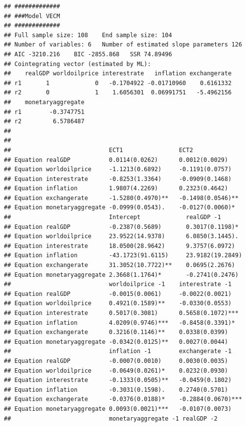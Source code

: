 \documentclass[11pt,preprint, authoryear]{elsarticle}
\numberwithin{equation}{section}
\numberwithin{figure}{section}
\numberwithin{table}{section}
\begin{document}
\begin{verbatim}
## #############
## ###Model VECM 
## #############
## Full sample size: 108    End sample size: 104
## Number of variables: 6   Number of estimated slope parameters 126
## AIC -3210.216    BIC -2855.868   SSR 74.89496
## Cointegrating vector (estimated by ML):
##    realGDP worldoilprice interestrate   inflation exchangerate
## r1       1             0   -0.1704922 -0.01710960    0.6161332
## r2       0             1    1.6056301  0.06991751   -5.4962156
##    monetaryaggregate
## r1        -0.3747751
## r2         6.5786487
## 
## 
##                            ECT1                ECT2               
## Equation realGDP           0.0114(0.0262)      0.0012(0.0029)     
## Equation worldoilprice     -1.1213(0.6892)     -0.1191(0.0757)    
## Equation interestrate      -0.8253(1.3364)     -0.0909(0.1468)    
## Equation inflation         1.9807(4.2269)      0.2323(0.4642)     
## Equation exchangerate      -1.5280(0.4970)**   -0.1498(0.0546)**  
## Equation monetaryaggregate -0.0999(0.0543).    -0.0127(0.0060)*   
##                            Intercept             realGDP -1          
## Equation realGDP           -0.2387(0.5689)       0.3017(0.1198)*     
## Equation worldoilprice     23.9522(14.9378)      6.0850(3.1445).     
## Equation interestrate      18.0500(28.9642)      9.3757(6.0972)      
## Equation inflation         -43.1723(91.6115)     23.9182(19.2849)    
## Equation exchangerate      31.3052(10.7722)**    0.0695(2.2676)      
## Equation monetaryaggregate 2.3668(1.1764)*       -0.2741(0.2476)     
##                            worldoilprice -1    interestrate -1    
## Equation realGDP           -0.0015(0.0061)     -0.0022(0.0021)    
## Equation worldoilprice     0.4921(0.1589)**    -0.0330(0.0553)    
## Equation interestrate      0.5017(0.3081)      0.5658(0.1072)***  
## Equation inflation         4.0209(0.9746)***   -0.8458(0.3391)*   
## Equation exchangerate      0.3216(0.1146)**    0.0338(0.0399)     
## Equation monetaryaggregate -0.0342(0.0125)**   0.0027(0.0044)     
##                            inflation -1        exchangerate -1    
## Equation realGDP           -0.0007(0.0010)     0.0030(0.0035)     
## Equation worldoilprice     -0.0649(0.0261)*    0.0232(0.0930)     
## Equation interestrate      -0.1333(0.0505)**   -0.0459(0.1802)    
## Equation inflation         -0.3031(0.1598).    0.2740(0.5701)     
## Equation exchangerate      -0.0376(0.0188)*    -0.2884(0.0670)*** 
## Equation monetaryaggregate 0.0093(0.0021)***   -0.0107(0.0073)    
##                            monetaryaggregate -1 realGDP -2           

\end{verbatim}
\end{document}
